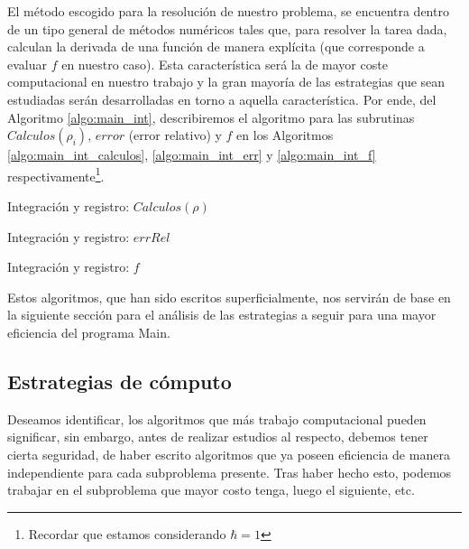 \quad El m\'etodo escogido para la resoluci\'on de nuestro problema, se encuentra dentro de un tipo general de m\'etodos num\'ericos tales que, para resolver la tarea dada, calculan la derivada de una funci\'on de manera expl\'icita (que corresponde a evaluar $f$ en nuestro caso). Esta caracter\'istica ser\'a la de mayor coste computacional en nuestro trabajo y la gran mayor\'ia de las estrategias que sean estudiadas ser\'an desarrolladas en torno a aquella caracter\'istica. Por ende, del Algoritmo \ref{algo:main_int}, describiremos el algoritmo para las subrutinas $Calculos(\rho_i)$, $error$ (error relativo) y $f$ en los Algoritmos \ref{algo:main_int_calculos}, \ref{algo:main_int_err} y \ref{algo:main_int_f} respectivamente\footnote{Recordar que estamos considerando $\hbar=1$}.

\begin{algorithm}
 \caption{Integraci\'on y registro: $Calculos(\rho)$}\label{algo:main_int_calculos}
\LinesNumbered
\KwIn{$\rho$}
\end{algorithm}

\begin{algorithm}
 \caption{Integraci\'on y registro: $errRel$}\label{algo:main_int_err}
\LinesNumbered
{}
\end{algorithm}

\begin{algorithm}
 \caption{Integraci\'on y registro: $f$}\label{algo:main_int_f}
\LinesNumbered
{}
\end{algorithm}

\quad Estos algoritmos, que han sido escritos superficialmente, nos servir\'an de base en la siguiente secci\'on para el an\'alisis de las estrategias a seguir para una mayor eficiencia del programa Main.
\subsection{Estrategias de c\'omputo} %
\quad Deseamos identificar, los algoritmos que m\'as trabajo computacional pueden significar, sin embargo, antes de realizar estudios al respecto, debemos tener cierta seguridad, de haber escrito algoritmos que ya poseen eficiencia de manera independiente para cada subproblema presente. Tras haber hecho esto, podemos trabajar en el subproblema que mayor costo tenga, luego el siguiente, etc.\\

